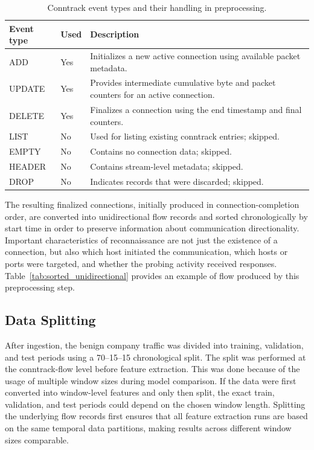 \begin{table}[h]
    \centering
    \small
    \setlength{\tabcolsep}{12pt}
    \caption{Conntrack event types and their handling in preprocessing.}
    \label{tab:conntrack_event_types}
    \begin{tabular}{llp{}}
        \toprule
        Event type & Used & Description \\
        \midrule
        ADD     & Yes  & Initializes a new active connection using available packet metadata. \\
        UPDATE  & Yes  & Provides intermediate cumulative byte and packet counters for an active connection. \\
        DELETE  & Yes  & Finalizes a connection using the end timestamp and final counters. \\
        LIST    & No   & Used for listing existing conntrack entries; skipped. \\
        EMPTY   & No   & Contains no connection data; skipped. \\
        HEADER  & No   & Contains stream-level metadata; skipped. \\
        DROP    & No   & Indicates records that were discarded; skipped. \\
        \bottomrule
    \end{tabular}
\end{table}

The resulting finalized connections, initially produced in connection-completion order, are converted into unidirectional flow records and sorted chronologically by start time in order to preserve information about communication directionality. Important characteristics of reconnaissance are not just the existence of a connection, but also which host initiated the communication, which hosts or ports were targeted, and whether the probing activity received responses. Table~\ref{tab:sorted_unidirectional} provides an example of flow produced by this preprocessing step.



\subsection{Data Splitting}
After ingestion, the benign company traffic was divided into training, validation, and test periods using a 70--15--15 chronological split. The split was performed at the conntrack-flow level before feature extraction. This was done because of the usage of multiple window sizes during model comparison. If the data were first converted into window-level features and only then split, the exact train, validation, and test periods could depend on the chosen window length. Splitting the underlying flow records first ensures that all feature extraction runs are based on the same temporal data partitions, making results across different window sizes comparable.

